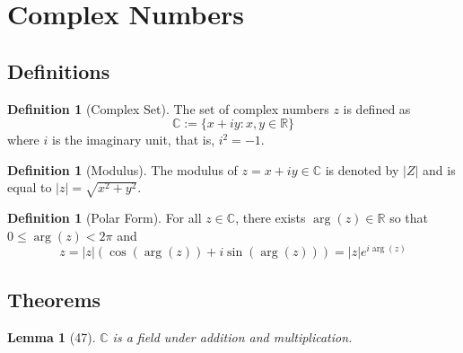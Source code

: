 \documentclass[12pt]{article}
\newtheorem{lem}[thm]{Lemma}  %
\theoremstyle{definition}
\newtheorem{defn}[thm]{Definition}
\theoremstyle{remark}
\numberwithin{equation}{section}
\newcommand\C{\mathbb C}    %
\newcommand\R{\mathbb R}    %
\begin{document}
\clearpage


\section{Complex Numbers}


\subsection{Definitions}

\begin{defn}[Complex Set]
        The set of complex numbers $z$ is defined as $$\C := \{x+iy:x,y \in \R\}$$ where $i$ is the imaginary unit, that is, $i^2 = -1$.
\end{defn}

\begin{figure}[H]
\end{figure}


\begin{defn}[Modulus]
        The modulus of $z = x + iy \in \C$ is denoted by $|Z|$ and is equal to $|z| = \sqrt{x^2+y^2}$.
\end{defn}



\begin{defn}[Polar Form]
        For all $z \in \C$, there exists $\arg(z) \in \R$ so that $0 \leq \arg(z) < 2\pi$ and $$z = |z|(\cos(\arg(z)) + i\sin(\arg(z))) = |z|e^{i\arg(z)}$$
\end{defn}





\subsection{Theorems}

\begin{lem}[47]
        $\C$ is a field under addition and multiplication.
\end{lem}
\end{document}
